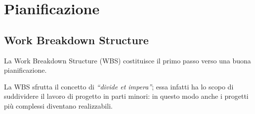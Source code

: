 



\section{Pianificazione}
\subsection{Work Breakdown Structure}

La Work Breakdown Structure (WBS) costituisce il primo passo verso una buona pianificazione.

La WBS sfrutta il concetto di \textit{``divide et impera''}; essa infatti ha lo scopo di suddividere il lavoro di progetto in parti minori: in questo modo anche i progetti più complessi diventano realizzabili.

